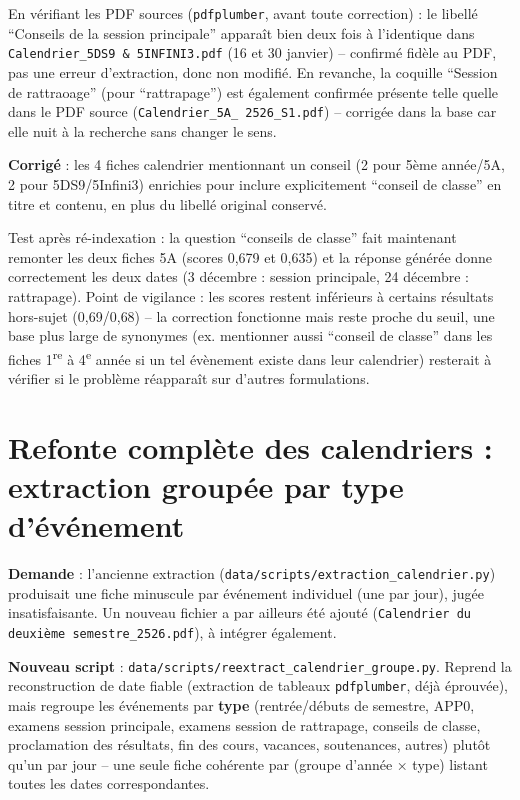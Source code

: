 \documentclass[11pt,a4paper]{report}
\begin{document}
En vérifiant les PDF sources (\texttt{pdfplumber}, avant toute correction) : le libellé
``Conseils de la session principale'' apparaît bien deux fois à l'identique dans
\texttt{Calendrier\_5DS9 \& 5INFINI3.pdf} (16 et 30 janvier) -- confirmé fidèle au PDF,
pas une erreur d'extraction, donc non modifié. En revanche, la coquille ``Session de
rattraoage'' (pour ``rattrapage'') est également confirmée présente telle quelle dans le
PDF source (\texttt{Calendrier\_5A\_ 2526\_S1.pdf}) -- corrigée dans la base car elle
nuit à la recherche sans changer le sens.

\textbf{Corrigé} : les 4 fiches calendrier mentionnant un conseil (2 pour 5ème année/5A,
2 pour 5DS9/5Infini3) enrichies pour inclure explicitement ``conseil de classe'' en
titre et contenu, en plus du libellé original conservé.

\begin{statutfait}
Test après ré-indexation : la question ``conseils de classe'' fait maintenant remonter
les deux fiches 5A (scores 0{,}679 et 0{,}635) et la réponse générée donne correctement
les deux dates (3 décembre : session principale, 24 décembre : rattrapage). Point de
vigilance : les scores restent inférieurs à certains résultats hors-sujet (0{,}69/0{,}68)
-- la correction fonctionne mais reste proche du seuil, une base plus large de synonymes
(ex. mentionner aussi ``conseil de classe'' dans les fiches 1\textsuperscript{re} à
4\textsuperscript{e} année si un tel évènement existe dans leur calendrier) resterait à
vérifier si le problème réapparaît sur d'autres formulations.
\end{statutfait}

\section{Refonte complète des calendriers : extraction groupée par type d'événement}

\textbf{Demande} : l'ancienne extraction (\texttt{data/scripts/extraction\_calendrier.py})
produisait une fiche minuscule par événement individuel (une par jour), jugée
insatisfaisante. Un nouveau fichier a par ailleurs été ajouté
(\texttt{Calendrier du deuxième semestre\_2526.pdf}), à intégrer également.

\textbf{Nouveau script} : \texttt{data/scripts/reextract\_calendrier\_groupe.py}.
Reprend la reconstruction de date fiable (extraction de tableaux \texttt{pdfplumber},
déjà éprouvée), mais regroupe les événements par \textbf{type}
(rentrée/débuts de semestre, APP0, examens session principale, examens session de
rattrapage, conseils de classe, proclamation des résultats, fin des cours, vacances,
soutenances, autres) plutôt qu'un par jour -- une seule fiche cohérente par (groupe
d'année × type) listant toutes les dates correspondantes.
\end{document}
